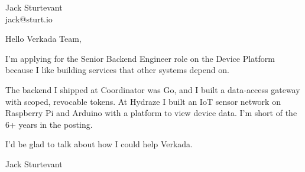 \documentclass[11pt]{article}
\begin{document}
\raggedright

{\namefont\fontsize{20pt}{24pt}\selectfont Jack Sturtevant}\\[-0.3em]
jack@sturt.io

\vspace{1.2em}

Hello Verkada Team,

I'm applying for the Senior Backend Engineer role on the Device Platform because I like building services that other systems depend on.

The backend I shipped at Coordinator was Go, and I built a data-access gateway with scoped, revocable tokens. At Hydraze I built an IoT sensor network on Raspberry Pi and Arduino with a platform to view device data. I'm short of the 6+ years in the posting.

I'd be glad to talk about how I could help Verkada.

\vspace{0.6em}
Jack Sturtevant
\end{document}
